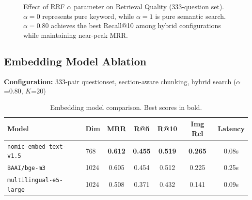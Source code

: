 \documentclass[11pt,a4paper]{article}
\begin{document}
\begin{figure}[h]
\centering
{}
\caption{Effect of RRF $\alpha$ parameter on Retrieval Quality (333-question set). $\alpha=0$ represents pure keyword, while $\alpha=1$ is pure semantic search. $\alpha=0.80$ achieves the best Recall@10 among hybrid configurations while maintaining near-peak MRR.}
\label{fig:alpha_sweep}
\end{figure}

\subsection{Embedding Model Ablation}
\label{sec:embedding-axis}

\textbf{Configuration:} 333-pair questionset, section-aware chunking, hybrid search ($\alpha$=0.80, $K$=20)

\begin{table}[h]
\caption{Embedding model comparison. Best scores in bold.}
\label{tab:embedding}
\centering
\begin{tabular}{llccccc}
\toprule
\textbf{Model} & \textbf{Dim} & \textbf{MRR} & \textbf{R@5} & \textbf{R@10} & \textbf{Img Rcl} & \textbf{Latency} \\
\midrule
\texttt{nomic-embed-text-v1.5} & 768 & \textbf{0.612} & \textbf{0.455} & \textbf{0.519} & \textbf{0.265} & 0.08s \\
\texttt{BAAI/bge-m3} & 1024 & 0.605 & 0.454 & 0.512 & 0.225 & 0.25s \\
\texttt{multilingual-e5-large} & 1024 & 0.508 & 0.371 & 0.432 & 0.141 & 0.09s \\
\bottomrule
\end{tabular}

\end{table}
\end{document}
